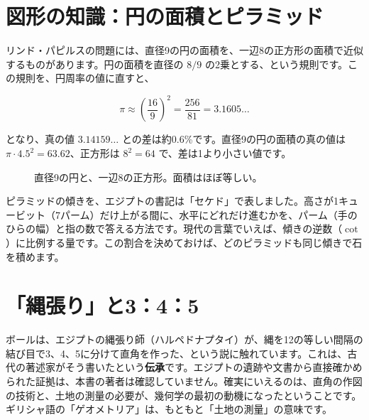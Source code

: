 \documentclass[a4paper,11pt,openany]{ltjsbook}
\begin{document}
\section{図形の知識：円の面積とピラミッド}

リンド・パピルスの問題には、直径9の円の面積を、一辺8の正方形の面積で近似するものがあります。円の面積を直径の $8/9$ の2乗とする、という規則です。この規則を、円周率の値に直すと、

\[
\pi \approx \left(\frac{16}{9}\right)^2=\frac{256}{81}=3.1605\ldots
\]

となり、真の値 $3.14159\ldots$ との差は約0.6\%です。直径9の円の面積の真の値は $\pi\cdot 4.5^2=63.62$、正方形は $8^2=64$ で、差は1より小さい値です。

\begin{figure}[htbp]
\centering
{}
\caption{直径9の円と、一辺8の正方形。面積はほぼ等しい。}
\end{figure}

ピラミッドの傾きを、エジプトの書記は「セケド」で表しました。高さが1キュービット（7パーム）だけ上がる間に、水平にどれだけ進むかを、パーム（手のひらの幅）と指の数で答える方法です。現代の言葉でいえば、傾きの逆数（$\cot$）に比例する量です。この割合を決めておけば、どのピラミッドも同じ傾きで石を積めます。

\section{「縄張り」と3：4：5}

ボールは、エジプトの縄張り師（ハルペドナプタイ）が、縄を12の等しい間隔の結び目で3、4、5に分けて直角を作った、という説に触れています。これは、古代の著述家がそう書いたという\textbf{伝承}です。エジプトの遺跡や文書から直接確かめられた証拠は、本書の著者は確認していません。確実にいえるのは、直角の作図の技術と、土地の測量の必要が、幾何学の最初の動機になったということです。ギリシャ語の「ゲオメトリア」は、もともと「土地の測量」の意味です。
\end{document}
